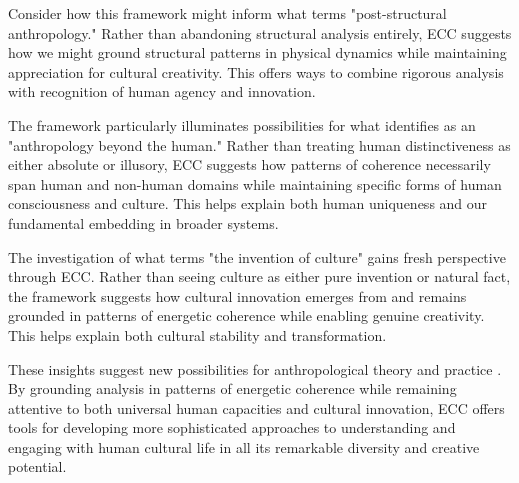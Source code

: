 Consider how this framework might inform what \cite{viveiros2014cannibal} terms "post-structural anthropology." Rather than abandoning structural analysis entirely, ECC suggests how we might ground structural patterns in physical dynamics while maintaining appreciation for cultural creativity. This offers ways to combine rigorous analysis with recognition of human agency and innovation.

The framework particularly illuminates possibilities for what \cite{kohn2013forests} identifies as an "anthropology beyond the human." Rather than treating human distinctiveness as either absolute or illusory, ECC suggests how patterns of coherence necessarily span human and non-human domains while maintaining specific forms of human consciousness and culture. This helps explain both human uniqueness and our fundamental embedding in broader systems.

The investigation of what \cite{wagner2016invention} terms "the invention of culture" gains fresh perspective through ECC. Rather than seeing culture as either pure invention or natural fact, the framework suggests how cultural innovation emerges from and remains grounded in patterns of energetic coherence while enabling genuine creativity. This helps explain both cultural stability and transformation.

These insights suggest new possibilities for anthropological theory and practice \cite{rabinow2008marking}. By grounding analysis in patterns of energetic coherence while remaining attentive to both universal human capacities and cultural innovation, ECC offers tools for developing more sophisticated approaches to understanding and engaging with human cultural life in all its remarkable diversity and creative potential.